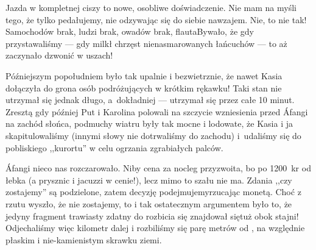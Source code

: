 
Jazda w kompletnej ciszy to nowe, osobliwe doświadczenie. Nie mam na myśli tego, że tylko pedałujemy, nie odzywając się do siebie nawzajem. Nie, to nie tak! Samochodów brak, ludzi brak, owadów brak, flauta\textellipsis By\-wało, że gdy przystawaliśmy --- gdy milkł chrzęst nienasmarowanych łańcuchów --- to aż zaczynało dzwonić w uszach!

Późniejszym popołudniem było tak upalnie i bezwietrznie, że nawet Kasia dołączyła do grona osób podróżujących w krótkim rękawku! Taki stan nie utrzymał się jednak długo, a~dokładniej --- utrzymał się przez całe 10 minut. Zresztą gdy później Put i Karolina polowali na szczycie wzniesienia przed Áfangi na zachód słońca, podmuchy wiatru były tak mocne i lodowate, że Kasia i ja skapitulowaliśmy (innymi słowy nie dotrwaliśmy do zachodu) i~udaliśmy się do pobliskiego ,,kurortu'' w celu ogrzania zgrabiałych palców.

Áfangi nieco nas rozczarowało. Niby cena za nocleg przyzwoita, bo po 1200~kr od łebka (a prysznic i jacuzzi w cenie!), lecz mimo to szału nie ma. Zdania ,,czy zostajemy'' są podzielone, zatem decyzję podejmujemy\textellipsis rzucając monetą. Choć z rzutu wyszło, że nie zostajemy, to i tak ostatecznym argumentem było to, że jedyny fragment trawiasty zdatny do rozbicia się znajdował się\textellipsis tuż obok stajni! Odjechaliśmy więc kilometr dalej i rozbiliśmy się parę metrów od , na względnie płaskim i nie-kamienistym skrawku ziemi.


\pagebreak

